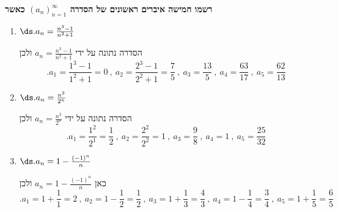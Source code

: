 \textbf{רשמו חמישה איברים ראשונים של הסדרה
$(a_n)_{n=1}^{\infty}$
כאשר}
\begin{enumerate}
\item $\ds .a_n=\frac{n^3-1}{n^2+1}$
\begin{solbox}
הסדרה נתונה על ידי
$a_n=\frac{n^3-1}{n^2+1}$
ולכן
$$.a_1=\frac{1^3-1}{1^2+1}=0\ ,\ a_2=\frac{2^3-1}{2^2+1}=\frac75\ ,\ a_3=\frac{13}{5}\ ,\ a_4=\frac{63}{17}\ ,\ a_5=\frac{62}{13}$$
\end{solbox}
\item $\ds .a_n=\frac{n^2}{2^n}$
\begin{solbox}
הסדרה נתונה על ידי
$a_n=\frac{n^2}{2^n}$
ולכן
$$.a_1=\frac{1^2}{2^1}=\frac12\ ,\ a_2=\frac{2^2}{2^2}=1\ ,\ a_3=\frac98\ ,\ a_4=1\ ,\ a_5=\frac{25}{32}$$
\end{solbox}
\item $\ds .a_n=1-\frac{(-1)^n}{n}$
\begin{solbox}
כאן
$a_n=1-\frac{(-1)^n}{n}$
ולכן
$$.a_1=1+\frac11=2\ ,\ a_2=1-\frac12=\frac12\ ,\ a_3=1+\frac13=\frac43\ ,\ a_4=1-\frac14=\frac34\ ,\ a_5=1+\frac15=\frac65$$
\end{solbox}
\eMs
\end{enumerate}
